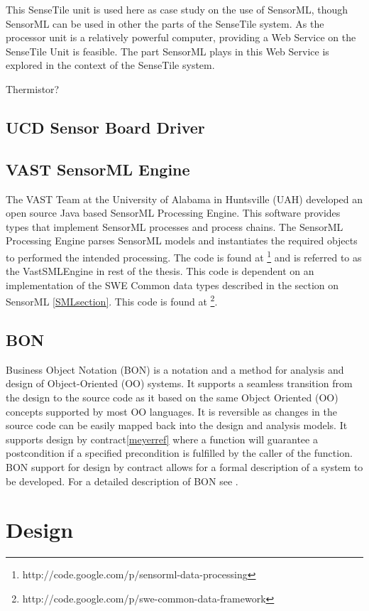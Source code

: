 \documentclass[]{final_report}
\begin{document}
This SenseTile unit is used here as case study on the use of SensorML, though SensorML can be used in other the parts of the SenseTile system. As the processor unit is a relatively powerful computer, providing a Web Service on the SenseTile Unit is feasible. The part SensorML plays in this Web Service is explored in the context of the SenseTile system.

Thermistor?

\section{UCD Sensor Board Driver}\label{SensorBoardDriverSec}


\section{VAST SensorML Engine}\label{VastSensorMLEngineSec}
The VAST Team at the University of Alabama in Huntsville (UAH)  developed an open source Java based SensorML Processing Engine. This software provides types that implement SensorML processes and process  chains. The SensorML Processing Engine parses SensorML models and instantiates the required objects to performed the intended processing. The code is found at \footnote{http://code.google.com/p/sensorml-data-processing} and is referred to as the VastSMLEngine in rest of the thesis. This code is dependent on an implementation of the SWE Common data types described in the section on SensorML \ref{SMLsection}. This code is found at \footnote{http://code.google.com/p/swe-common-data-framework}.


\section{BON} \label{BONsec}
Business Object Notation (BON) is a notation and a method for analysis and design of Object-Oriented (OO) systems. It supports a seamless transition from the design to the source code as it based on the same Object Oriented (OO) concepts supported by most OO languages. It is reversible as changes in the source code can be easily mapped back into the design and analysis models. It supports design by contract\ref{meyerref} where a function will guarantee a postcondition if a specified precondition is fulfilled by the caller of the function. BON support for design by contract allows for a formal description of a system to be developed. For a detailed description of BON see \cite{BONref}.
\chapter{Design}
\end{document}
